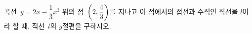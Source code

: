 곡선~$y=2x-\dfrac{1}{3}x^3$ 위의 점~$\left(2{,}\mkern3mu\mathopen{}\dfrac{4}{3}\right)$를 지나고 이 점에서의 접선과 수직인 직선을 $l$이라 할 때, 직선~$l$의 $y$절편을 구하시오.
